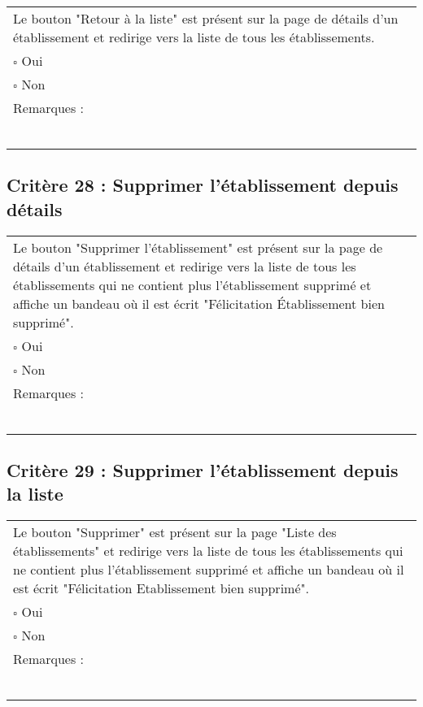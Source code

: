 	\begin{center}
    	 		\begin{tabular}[h]{|p{}|}
			\hline
				Le bouton "Retour à la liste" est présent sur la page de détails d'un établissement et redirige vers la liste de tous les établissements.\\
				$\square$ Oui  \\ $\square$ Non \\\hline Remarques : \\ ~\\
			 \\\hline
     		\end{tabular}
  		\end{center}	
  		
  		
  		\subsection*{Critère 28 : Supprimer l'établissement depuis détails}
	
	\begin{center}
    	 		\begin{tabular}[h]{|p{}|}
			\hline
				Le bouton "Supprimer l'établissement" est présent sur la page de détails d'un établissement et redirige vers la liste de tous les établissements qui ne contient plus l'établissement supprimé et affiche un bandeau où il est écrit "Félicitation Établissement bien supprimé".\\
				$\square$ Oui  \\ $\square$ Non \\\hline Remarques : \\ ~\\
			 \\\hline
     		\end{tabular}
  		\end{center}
  		
  		
  		
  			\subsection*{Critère 29 : Supprimer l'établissement depuis la liste}
	
	\begin{center}
    	 		\begin{tabular}[h]{|p{}|}
			\hline
				Le bouton "Supprimer" est présent sur la page "Liste des établissements" et redirige vers la liste de tous les établissements qui ne contient plus l'établissement supprimé et affiche un bandeau où il est écrit "Félicitation Etablissement bien supprimé".\\
				$\square$ Oui  \\ $\square$ Non \\\hline Remarques : \\ ~\\
			 \\\hline
     		\end{tabular}
  		\end{center}

